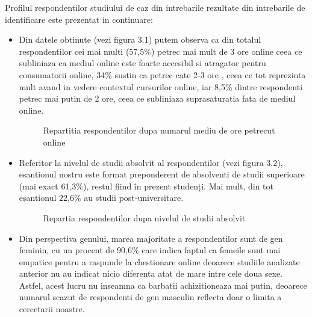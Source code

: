 \documentclass[a4paper, 12pt]{article}
\begin{document}
		\qquad Profilul respondentilor studiului de caz din intrebarile rezultate din intrebarile de identificare este prezentat in continuare:
		\begin{itemize}
			\item Din datele obtinute (vezi figura 3.1) putem observa ca din totalul respondentilor cei mai multi (57,5\%) petrec mai mult de 3 ore online ceea ce subliniaza ca mediul online este foarte accesibil si atragator pentru consumatorii online, 34\% sustin ca petrec cate 2-3 ore , ceea ce tot reprezinta mult avand in vedere contextul cursurilor online, iar 8,5\% dintre respondenti petrec mai putin de 2 ore, ceea ce subliniaza suprasaturatia  fata de mediul online.
			\begin{figure}[!htb]
				\centering
				\caption{Repartitia respondentilor dupa numarul mediu de ore petrecut online } 
			\end{figure}
		\newpage
		\item Referitor la nivelul de studii absolvit al respondentilor (vezi figura 3.2), esantionul nostru este format  preponderent de absolventi de studii superioare (mai exact 61,3\%), restul fiind în prezent studenți. Mai mult, din tot eșantionul 22,6\% au studii post-universitare.
		\begin{figure}[!htb]
			\centering
			\caption{Repartia respondentilor dupa nivelul de studii absolvit} 
		\end{figure}
		\item Din perspectiva genului, marea majoritate a respondentilor sunt de gen feminin, cu un procent de 90,6\% care indica faptul ca femeile sunt mai empatice pentru a raspunde la chestionare online deoarece studiile analizate anterior nu au indicat nicio diferenta atat de mare intre cele doua sexe. Astfel, acest lucru nu inseamna ca barbatii achizitioneaza mai putin, deoarece numarul scazut de respondenti de gen masculin reflecta doar o limita a cercetarii noastre.
		\end{itemize}
\end{document}
